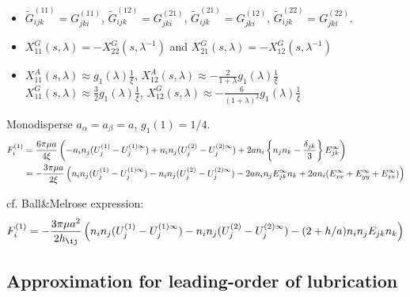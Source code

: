 \documentclass[12pt]{article}
\begin{document}
\begin{itemize}
 \item $\tilde{G}_{ijk}^{(11)}=G_{jki}^{(11)}$,
$\tilde{G}_{ijk}^{(12)}=G_{jki}^{(21)}$,
$\tilde{G}_{ijk}^{(21)}=G_{jki}^{(12)}$,
$\tilde{G}_{ijk}^{(22)}=G_{jki}^{(22)}$.

 \item 
$X_{11}^{G}(s,\lambda)
= - X_{22}^{G} (s, \lambda^{-1})$
and $X_{21}^{G}(s,\lambda)
= - X_{12}^{G} (s, \lambda^{-1})$

 \item 
$X_{11}^{A}(s,\lambda)\approx g_1(\lambda) \frac{1}{\xi}$, 
$X_{12}^{A}(s,\lambda) \approx -\frac{2}{1+\lambda}g_1(\lambda) \frac{1}{\xi}$\\
$X_{11}^{G}(s,\lambda)\approx \frac{3}{2} g_1(\lambda) \frac{1}{\xi}$,
$X_{12}^{G}(s,\lambda)\approx -\frac{6}{(1+\lambda)^2} g_1(\lambda) \frac{1}{\xi}$   
\end{itemize}
Monodisperse $a_\alpha = a_{\beta}=a$, $g_1(1)=1/4$.
\begin{align}
 F^{(1)}_i
&= 
\frac{6 \pi\mu a}{4\xi}
\left(
-   n_i n_j
(U_{j}^{(1)}-U_{j}^{(1)\infty})
+   n_i n_j
(U_{j}^{(2)}-U_{j}^{(2)\infty})
+  
2a n_i\left\{n_j n_k - \frac{\delta_{jk}}{3} \right\} E^{\infty}_{jk}
\right) \notag \\
&= 
-
\frac{3 \pi\mu a}{2\xi}
\left(
   n_i n_j
(U_{j}^{(1)}-U_{j}^{(1)\infty})
-   n_i n_j
(U_{j}^{(2)}-U_{j}^{(2)\infty})
-  
2a n_in_j  E^{\infty}_{jk}n_k
+2an_i(E^{\infty}_{xx}+E^{\infty}_{yy}+E^{\infty}_{zz} )
\right)
\end{align}

cf. Ball\&Melrose expression:
\begin{equation}
F_i^{(1)}
=
- 
\frac{3 \pi \mu a^2}{2 h_{\ij}}
\left(
n_{i} n_j (U^{(1)}_j-U^{(1)\infty}_j)
- n_{i} n_j (U^{(2)}_j-U^{(2)\infty}_j)
- (2+h/a) n_i n_j  E_{jk}n_k
\right) 
 \end{equation}

\subsection{Approximation for leading-order of lubrication}
\end{document}
